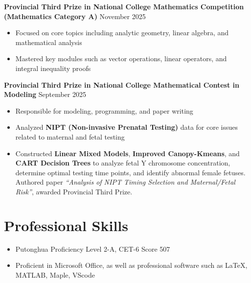 	
	\textbf{Provincial Third Prize in National College Mathematics Competition (Mathematics Category A)} \hfill November 2025%
	\begin{itemize}
		\item Focused on core topics including analytic geometry, linear algebra, and mathematical analysis
		\item Mastered key modules such as vector operations, linear operators, and integral inequality proofs
	\end{itemize}
	
	
	
	
	\textbf{Provincial Third Prize in National College Mathematical Contest in Modeling} \hfill September 2025
	\begin{itemize}
		\item Responsible for modeling, programming, and paper writing
		\item Analyzed \textbf{NIPT (Non-invasive Prenatal Testing)} data for core issues related to maternal and fetal testing
		\item Constructed \textbf{Linear Mixed Models}, \textbf{Improved Canopy-Kmeans}, and \textbf{CART Decision Trees} to analyze fetal Y chromosome concentration, determine optimal testing time points, and identify abnormal female fetuses. Authored paper \textit{“Analysis of NIPT Timing Selection and Maternal/Fetal Risk”}, awarded Provincial Third Prize.
	\end{itemize}
	
	
	
	
	
	\section{\makebox[\widthof{\faGraduationCap}][c]{\color{WHU_Blue}{\faWrench}}\quad Professional Skills}
	\begin{itemize}
		\item Putonghua Proficiency Level 2-A, CET-6 Score 507
		\item Proficient in Microsoft Office, as well as professional software such as LaTeX, MATLAB, Maple, VScode
	\end{itemize}
	
